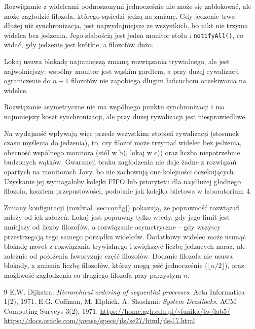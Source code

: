 \documentclass[11pt,a4paper]{article}
\begin{document}
Rozwiązanie z widelcami podnoszonymi jednocześnie nie może się zablokować, ale może zagłodzić
filozofa, którego sąsiedzi jedzą na zmianę. Gdy jedzenie trwa dłużej niż synchronizacja,
jest najwydajniejsze ze wszystkich, bo nikt nie trzyma widelca bez jedzenia. Jego słabością jest
jeden monitor stołu i \texttt{notifyAll()}, co widać, gdy jedzenie jest krótkie, a filozofów dużo.

Lokaj usuwa blokadę najmniejszą zmianą rozwiązania trywialnego, ale jest najwolniejszy:
wspólny monitor jest wąskim gardłem, a przy dużej rywalizacji ograniczenie do $n - 1$ filozofów
nie zapobiega długim łańcuchom oczekiwania na widelce.

Rozwiązanie asymetryczne nie ma wspólnego punktu synchronizacji i ma najmniejszy koszt
synchronizacji, ale przy dużej rywalizacji jest niesprawiedliwe.

Na wydajność wpływają więc przede wszystkim: stopień rywalizacji (stosunek czasu myślenia do jedzenia),
to, czy filozof może trzymać widelec bez jedzenia, obecność wspólnego monitora
(stół w b), lokaj w c)) oraz liczba niepotrzebnie budzonych wątków. Gwarancji braku zagłodzenia
nie daje żadne z rozwiązań opartych na monitorach Javy, bo nie zachowują one kolejności oczekujących.
Uzyskanie jej wymagałoby kolejki FIFO lub priorytetu dla najdłużej głodnego filozofa,
kosztem przepustowości, podobnie jak kolejka biletowa w laboratorium 4.

Zmiany konfiguracji (rozdział \ref{sec:config}) pokazują, że poprawność rozwiązań zależy od ich założeń.
Lokaj jest poprawny tylko wtedy, gdy jego limit jest mniejszy od liczby filozofów,
a rozwiązanie asymetryczne -- gdy wszyscy przestrzegają tego samego porządku widelców.
Dodatkowy widelec może usunąć blokadę nawet z rozwiązania trywialnego i zwiększyć liczbę jedzących
naraz, ale zależnie od położenia faworyzuje część filozofów.
Dodanie filozofa nie usuwa blokady, a zmienia liczbę filozofów, którzy mogą jeść jednocześnie
($\lfloor n/2 \rfloor$), oraz możliwość zagłodzenia co drugiego filozofa przy parzystym $n$.

\begin{thebibliography}{9}
     E.W. Dijkstra: \textit{Hierarchical ordering of sequential processes}. Acta Informatica 1(2), 1971.
     E.G. Coffman, M. Elphick, A. Shoshani: \textit{System Deadlocks}. ACM Computing Surveys 3(2), 1971.
     \url{https://home.agh.edu.pl/~funika/tw/lab5/}
     \url{https://docs.oracle.com/javase/specs/jls/se27/html/jls-17.html}
\end{thebibliography}
\end{document}
